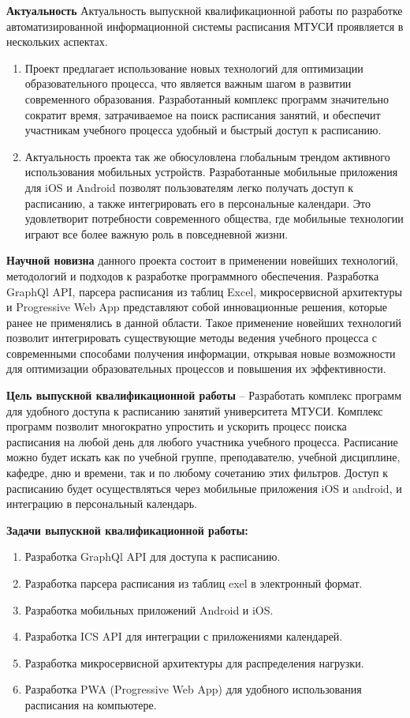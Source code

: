 \textbf{Актуальность}
Актуальность выпускной квалификационной работы по разработке автоматизированной информационной системы расписания МТУСИ проявляется в нескольких аспектах.
\begin{enumerate}
    \item Проект предлагает использование новых технологий для оптимизации образовательного процесса, что является важным шагом в развитии современного образования. 
    Разработанный комплекс программ значительно сократит время, затрачиваемое на поиск расписания занятий, и обеспечит участникам учебного процесса 
    удобный и быстрый доступ к расписанию.
    \item Актуальность проекта так же обюсуловлена глобальным трендом активного использования мобильных устройств. 
    Разработанные мобильные приложения для iOS и Android позволят пользователям легко получать доступ к расписанию, 
    а также интегрировать его в персональные календари. Это удовлетворит потребности современного общества, где мобильные технологии играют все более важную роль в повседневной жизни.
\end{enumerate}

\textbf{Научной новизна} данного проекта состоит в применении новейших технологий, методологий и подходов к разработке программного обеспечения. 
Разработка GraphQl API, парсера расписания из таблиц Excel, микросервисной архитектуры и Progressive Web App представляют собой инновационные решения, 
которые ранее не применялись в данной области. 
Такое применение новейших технологий позволит интегрировать существующие методы ведения учебного процесса 
с современными способами получения информации, открывая новые возможности для оптимизации образовательных процессов и повышения их эффективности.

\newpage

\textbf{Цель выпускной квалификационной работы} -- Разработать комплекс программ для удобного доступа к расписанию занятий университета МТУСИ.
Комплекс программ позволит многократно упростить и ускорить процесс поиска расписания на любой день для любого участника учебного процесса.
Расписание можно будет искать как по учебной группе, преподавателю, учебной дисциплине, кафедре, дню и времени,
так и по любому сочетанию этих фильтров.
Доступ к расписанию будет осуществляться через мобильные приложения iOS и android, и интеграцию в персональный календарь.

\textbf{Задачи выпускной квалификационной работы:}
\begin{enumerate}
    \item Разработка GraphQl API для доступа к расписанию.
    \item Разработка парсера расписания из таблиц exel в электронный формат.
    \item Разработка мобильных приложений Android и iOS.
    \item Разработка ICS API для интеграции с приложениями календарей.
    \item Разработка микросервисной архитектуры для распределения нагрузки.
    \item Разработка PWA (Progressive Web App) для удобного использования расписания на компьютере.
\end{enumerate}